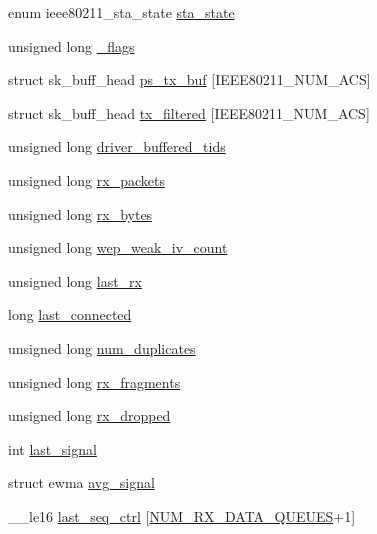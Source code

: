 \begin{DoxyCompactItemize}
\item 
enum ieee80211\-\_\-sta\-\_\-state \hyperlink{structsta__info_a0bb9a8b1f52f5d772f02e2421c893545}{sta\-\_\-state}
\item 
unsigned long \hyperlink{structsta__info_a8d0d1e503953e175f5716febfded04f0}{\-\_\-flags}
\item 
struct sk\-\_\-buff\-\_\-head \hyperlink{structsta__info_af43dd904dd2c48899bae7cff072a56b5}{ps\-\_\-tx\-\_\-buf} \mbox{[}I\-E\-E\-E80211\-\_\-\-N\-U\-M\-\_\-\-A\-C\-S\mbox{]}
\item 
struct sk\-\_\-buff\-\_\-head \hyperlink{structsta__info_a11b1213a5b6c2d45b8e5e4526ac01620}{tx\-\_\-filtered} \mbox{[}I\-E\-E\-E80211\-\_\-\-N\-U\-M\-\_\-\-A\-C\-S\mbox{]}
\item 
unsigned long \hyperlink{structsta__info_ad258a0c1471c80553236dd314610d03e}{driver\-\_\-buffered\-\_\-tids}
\item 
unsigned long \hyperlink{structsta__info_a056e6ed90717e599b8ee70649fcd14b0}{rx\-\_\-packets}
\item 
unsigned long \hyperlink{structsta__info_adfbb81d9e73e27eedc0750a0ea4cb7b7}{rx\-\_\-bytes}
\item 
unsigned long \hyperlink{structsta__info_a9eda8cff20a9c485782549583ccaac14}{wep\-\_\-weak\-\_\-iv\-\_\-count}
\item 
unsigned long \hyperlink{structsta__info_a2e9fc210260fb987fa6b767ef12930e7}{last\-\_\-rx}
\item 
long \hyperlink{structsta__info_a53686acd631d8f635a4c945952904896}{last\-\_\-connected}
\item 
unsigned long \hyperlink{structsta__info_a92103871c3849fc35afb2eefe76b249e}{num\-\_\-duplicates}
\item 
unsigned long \hyperlink{structsta__info_a5ac9d5a701fcf1a16343d0de95856e24}{rx\-\_\-fragments}
\item 
unsigned long \hyperlink{structsta__info_ac3653bc0393e5b307149b410d204ff5a}{rx\-\_\-dropped}
\item 
int \hyperlink{structsta__info_a1d01d8e411dc32dde1ab25208eab05f8}{last\-\_\-signal}
\item 
struct ewma \hyperlink{structsta__info_aa7659d752f4407855f0c482afbcd879f}{avg\-\_\-signal}
\item 
\-\_\-\-\_\-le16 \hyperlink{structsta__info_a1068cbcad5e62974b8a3a9e1de889b9f}{last\-\_\-seq\-\_\-ctrl} \mbox{[}\hyperlink{key_8h_a99cb7469613fea382d3951d37ee2c075}{N\-U\-M\-\_\-\-R\-X\-\_\-\-D\-A\-T\-A\-\_\-\-Q\-U\-E\-U\-E\-S}+1\mbox{]}
\item 

\end{DoxyCompactItemize}
